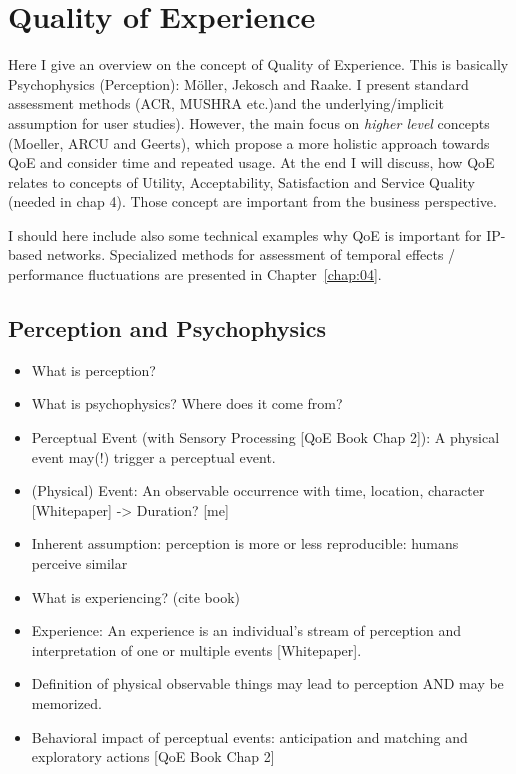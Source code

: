 \chapter{Quality of Experience}
\begin{chapter-abstract}
Here I give an overview on the concept of Quality of Experience.
This is basically Psychophysics (Perception): Möller, Jekosch and Raake.
I present standard assessment methods (ACR, MUSHRA etc.)and the underlying/implicit assumption for user studies).
However, the main focus on \textit{higher level} concepts (Moeller, ARCU and Geerts), which propose a more holistic approach towards QoE and consider time and repeated usage.
At the end I will discuss, how QoE relates to concepts of Utility, Acceptability, Satisfaction and Service Quality (needed in chap 4).
Those concept are important from the business perspective.

I should here include also some technical examples why QoE is important for IP-based networks.
Specialized methods for assessment of temporal effects / performance fluctuations are presented in Chapter~\ref{chap:04}.
\end{chapter-abstract}

\section{Perception and Psychophysics}
\begin{itemize}
\item What is perception?
\item What is psychophysics? Where does it come from?
\item Perceptual Event (with Sensory Processing [QoE Book Chap 2]): A physical event may(!) trigger a perceptual event.
\item (Physical) Event: An observable occurrence with time, location, character [Whitepaper] -> Duration? [me]
\item Inherent assumption: perception is more or less reproducible: humans perceive similar

\item What is experiencing? (cite book)
\item Experience: An experience is an individual's stream of perception and interpretation of one or multiple events [Whitepaper].
\item Definition of physical observable things may lead to perception AND may be memorized.
\item Behavioral impact of perceptual events: anticipation and matching and exploratory actions [QoE Book Chap 2]
\end{itemize}

